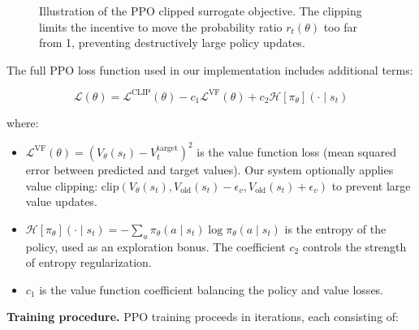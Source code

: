 \begin{figure}[H]
    \centering
    \caption{Illustration of the PPO clipped surrogate objective. The clipping limits the incentive to move the probability ratio $r_t(\theta)$ too far from 1, preventing destructively large policy updates.}
    \label{fig:ppo-clipping}
\end{figure}

The full PPO loss function used in our implementation includes additional terms:

\begin{equation}
    \mathcal{L}(\theta) = \mathcal{L}^{\text{CLIP}}(\theta) - c_1 \mathcal{L}^{\text{VF}}(\theta) + c_2 \mathcal{H}[\pi_\theta](\cdot \mid s_t)
\end{equation}

where:

\begin{itemize}
    \item $\mathcal{L}^{\text{VF}}(\theta) = (V_\theta(s_t) - V_t^{\text{target}})^2$ is the value function loss (mean squared error between predicted and target values). Our system optionally applies value clipping: $\text{clip}(V_\theta(s_t), V_{\text{old}}(s_t) - \epsilon_v, V_{\text{old}}(s_t) + \epsilon_v)$ to prevent large value updates.
    \item $\mathcal{H}[\pi_\theta](\cdot \mid s_t) = -\sum_a \pi_\theta(a \mid s_t) \log \pi_\theta(a \mid s_t)$ is the entropy of the policy, used as an exploration bonus. The coefficient $c_2$ controls the strength of entropy regularization.
    \item $c_1$ is the value function coefficient balancing the policy and value losses.
\end{itemize}

\textbf{Training procedure.} PPO training proceeds in iterations, each consisting of:

